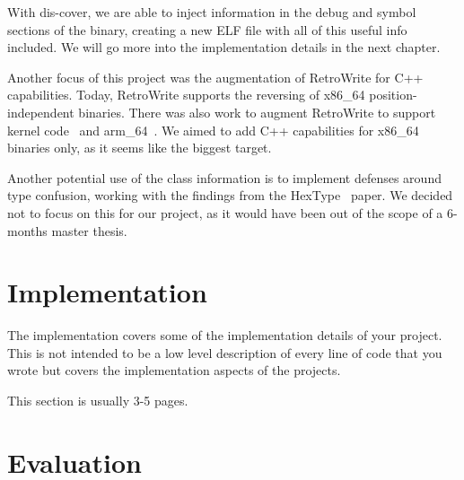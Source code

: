 \documentclass[a4paper,11pt,oneside]{report}
\begin{document}
With dis-cover, we are able to inject information in the debug and symbol sections of the binary, creating a new ELF file with all of this useful info included.
We will go more into the implementation details in the next chapter.

Another focus of this project was the augmentation of RetroWrite for C++ capabilities.
Today, RetroWrite supports the reversing of x86\_64 position-independent binaries.
There was also work to augment RetroWrite to support kernel code~\cite{rwkernel} and arm\_64~\cite{rwarm}.
We aimed to add C++ capabilities for x86\_64 binaries only, as it seems like the biggest target.

Another potential use of the class information is to implement defenses around type confusion, working with the findings from the HexType~\cite{hextype} paper.
We decided not to focus on this for our project, as it would have been out of the scope of a 6-months master thesis.


\chapter{Implementation}

The implementation covers some of the implementation details of your project.
This is not intended to be a low level description of every line of code that
you wrote but covers the implementation aspects of the projects.

This section is usually 3-5 pages.






\chapter{Evaluation}
\end{document}

